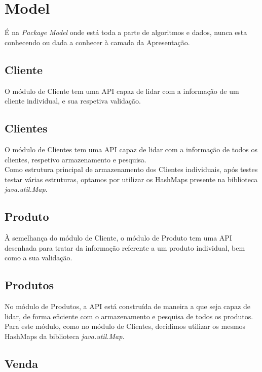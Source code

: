 \documentclass[a4paper]{report}
\begin{document}
\section{Model}

É na \textit{Package} \textit{Model} onde está toda a parte de algoritmos e dados, nunca 
esta conhecendo ou dada a conhecer à camada da Apresentação.

\subsection{Cliente}

O módulo de Cliente tem uma API capaz de lidar com a informação de um cliente
individual, e sua respetiva validação. 

\subsection{Clientes}

O módulo de Clientes tem uma API capaz de lidar com a informação de todos os
clientes, respetivo armazenamento e pesquisa. \\ 
Como estrutura principal de armazenamento dos Clientes individuais, após testes 
testar várias estruturas, optamos por utilizar os HashMaps presente na biblioteca
\textit{java.util.Map}.

\subsection{Produto}

À semelhança do módulo de Cliente, o módulo de Produto tem uma API desenhada
para tratar da informação referente a um produto individual, bem como a sua 
validação.

\subsection{Produtos}

No módulo de Produtos, a API está construída de maneira a que seja capaz de
lidar, de forma eficiente com o armazenamento e pesquisa de todos os produtos.\\
Para este módulo, como no módulo de Clientes, decidimos utilizar os mesmos HashMaps
da biblioteca \textit{java.util.Map}.

\subsection{Venda}
\end{document}

